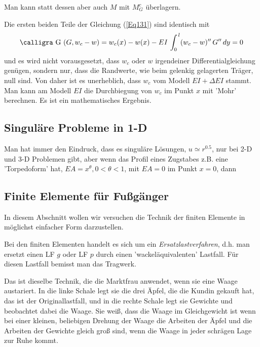 Man kann statt dessen aber auch $M$ mit $M_G^c$ \"{u}berlagern.
\begin{remark}
Die ersten beiden Teile der Gleichung (\ref{Eq131}) sind identisch mit
\begin{align}
\text{\normalfont\calligra G\,\,}(G,w_c - w) = w_c(x) - w(x) - EI\,\int_0^{\,l} (w_c - w)''\,G''\,dy = 0
\end{align}
und es wird nicht vorausgesetzt, dass $w_c$ oder $w$ irgendeiner Differentialgleichung gen\"{u}gen, sondern nur, dass die Randwerte, wie beim gelenkig gelagerten Tr\"{a}ger, null sind. Von daher ist es  unerheblich, dass $w_c$ vom Modell $EI + \Delta EI$ stammt. Man kann am Modell $EI$ die Durchbiegung von $w_c$ im Punkt $x$ mit 'Mohr' berechnen. Es ist ein mathematisches Ergebnis.
\end{remark}


\textcolor{blau2}{\subsection{Singul\"{a}re Probleme in 1-D}}\label{Singul\"{a}re Probleme in 1-D}
Man hat immer den Eindruck, dass es singul\"{a}re L\"{o}sungen, $u \simeq r^0.5$, nur bei 2-D und 3-D Problemen gibt, aber wenn das Profil eines Zugstabes z.B. eine 'Torpedoform' hat, $EA = x^\theta, 0 < \theta < 1$, mit $EA = 0$  im Punkt $x = 0$, dann

\textcolor{blau2}{\section{Finite Elemente f\"{u}r Fu{\ss}g\"{a}nger}}
In diesem Abschnitt wollen wir versuchen die Technik der finiten Elemente in m\"{o}glichst einfacher Form darzustellen.

Bei den finiten Elementen handelt es sich um ein {\em Ersatzlastverfahren\/}, d.h. man ersetzt einen LF $g$ oder LF $p$ durch einen 'wackel\"{a}quivalenten' Lastfall. F\"{u}r diesen Lastfall bemisst man das Tragwerk.

Das ist dieselbe Technik, die die Marktfrau anwendet, wenn sie eine Waage austariert. In die linke Schale legt sie die drei \"{A}pfel, die die Kundin gekauft hat, das ist der Originallastfall, und in die rechte Schale legt sie Gewichte und beobachtet dabei die Waage. Sie wei{\ss}, dass die Waage im Gleichgewicht ist wenn bei einer kleinen, beliebigen Drehung der Waage die Arbeiten der \"{A}pfel und die Arbeiten der Gewichte gleich gro{\ss} sind, wenn die Waage in jeder schr\"{a}gen Lage zur Ruhe kommt.

